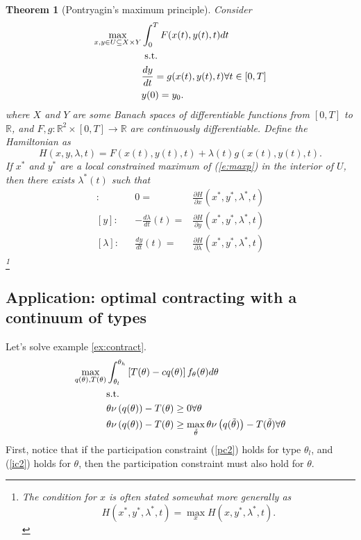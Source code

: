 \documentclass[12pt,reqno]{amsart}
\newtheorem{theorem}{Theorem}[section]
\theoremstyle{definition}
\def\R{\mathbb{R}}
\renewcommand{\to}{{\rightarrow}}
\begin{document}
\begin{theorem}[Pontryagin's maximum principle]\label{thm:optcon}
  Consider 
  \begin{align}
    \max_{x,y \in U \subseteq X \times Y} & \int_0^T F(x(t),y(t),t) dt \notag \\
    & \text{ s.t.} \\
    &  \frac{d y}{dt} = g(x(t),y(t),t) \forall t \in
    [0,T] \label{e:maxp} \\ 
    & y(0) = y_0. \notag
  \end{align}
  where $X$ and $Y$ are some Banach spaces of differentiable 
  functions from $[0,T]$ to $\R$, and $F,g:\R^2 \times [0,T] \to \R$ are
  continuously differentiable. Define the Hamiltonian as 
  \[ H(x,y,\lambda,t) = F(x(t),y(t),t) + \lambda(t) g(x(t),y(t),t). \]
  If $x^*$ and $y^*$ are a local constrained maximum of
  (\ref{e:maxp}) in the interior of $U$, then there exists
  $\lambda^*(t)$ such that 
  \begin{align*}
    [x]: && 0 = & \frac{\partial H}{\partial x}(x^*,y^*,\lambda^*,t)
    \\
    [y]: && -\frac{d\lambda}{dt}(t) = & \frac{\partial H}{\partial y}(x^*,y^*,\lambda^*,t) \\
    [\lambda]: && \frac{dy}{dt}(t) = & \frac{\partial H}{\partial
      \lambda}(x^*,y^*,\lambda^*,t)
  \end{align*}\footnote{The condition for $x$ is often stated somewhat
    more generally as
    \[ H(x^*,y^*,\lambda^*,t) = \max_x H(x,y^*,\lambda^*,t). \]
  }
\end{theorem}

\subsection{Application: optimal contracting with a continuum of
  types} 
Let's solve example \ref{ex:contract}. 
\begin{align}
  \max_{q(\theta),T(\theta)} & \int_{\theta_l}^{\theta_h} 
  \left[T(\theta) - cq(\theta)\right]
  f_\theta(\theta) d\theta \notag \\
  & \text{s.t.} \notag \\
  &\theta \nu\left(q(\theta)\right) - T(\theta) \geq 0  \forall
  \theta \label{pc2} \\
  &\theta \nu\left(q(\theta)\right) - T(\theta) \geq
  \max_{\tilde{\theta}} \theta \nu\left(q(\tilde{\theta}) \right) -
  T(\tilde{\theta}) \forall \theta \label{ic2} 
\end{align}
First, notice that if the participation constraint (\ref{pc2}) holds for type
$\theta_l$, and (\ref{ic2}) holds for $\theta$, then the participation
constraint must also hold for $\theta$. 
\end{document}
